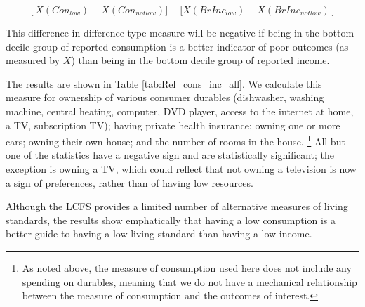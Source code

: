 \begin{equation}
\left[X(Con_{low})-X(Con_{notlow})] - [X(BrInc_{low})-X(BrInc_{notlow})\right]\label{eq:diffindiff}
\end{equation}

This difference-in-difference type measure will be negative if being in the bottom decile group of reported
consumption is a better indicator of poor outcomes (as measured by $X$) than being in the
bottom decile group of reported income.

The results are shown in Table \ref{tab:Rel_cons_inc_all}. We calculate this measure for ownership of various consumer durables
(dishwasher, washing machine, central heating, computer, DVD player,
access to the internet at home, a TV, subscription TV); having private health
insurance; owning one or more cars; owning their own house; and the
number of rooms in the house. \footnote{As noted above, the measure of consumption
used here does not include any spending on durables, meaning that we do not have a mechanical relationship
between the measure of consumption and the outcomes of interest.} All but
one of the statistics have a negative sign and are statistically significant;
the exception is owning a TV, which could reflect that not owning a television is now a sign of preferences, rather than of having low resources. 

Although the LCFS provides
a limited number of alternative measures of living standards, 
the results show emphatically that having a low consumption is
a better guide to having a low living standard than having a low
income.

